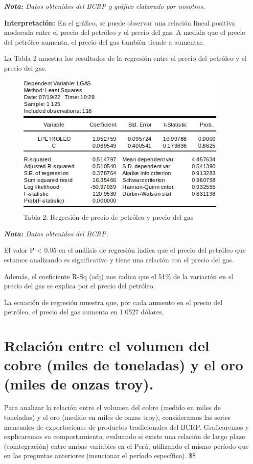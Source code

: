 \documentclass[
  a4paper,
]{article}
\begin{document}
\emph{\textbf{Nota:} Datos obtenidos del BCRP y gráfico elaborado por
nosotros.}

\textbf{Interpretación:} En el gráfico, se puede observar una relación
lineal positiva moderada entre el precio del petróleo y el precio del
gas. A medida que el precio del petróleo aumenta, el precio del gas
también tiende a aumentar.

La Tabla 2 muestra los resultados de la regresión entre el precio del
petróleo y el precio del gas.

\begin{figure}

\caption{Tabla 2: Regresión de precio de petróleo y precio del gas}

{\centering \includegraphics{20230603100307.png}

}

\end{figure}

\emph{\textbf{Nota:} Datos obtenidos del BCRP.}

El valor P \textless{} 0.05 en el análisis de regresión indica que el
precio del petróleo que estamos analizando es significativo y tiene una
relación con el precio del gas.

Además, el coeficiente R-Sq (adj) nos indica que el 51\% de la variación
en el precio del gas se explica por el precio del petróleo.

La ecuación de regresión muestra que, por cada aumento en el precio del
petróleo, el precio del gas aumenta en 1.0527 dólares.

\hypertarget{relaciuxf3n-entre-el-volumen-del-cobre-miles-de-toneladas-y-el-oro-miles-de-onzas-troy.}{%
\section{Relación entre el volumen del cobre (miles de toneladas) y el
oro (miles de onzas
troy).}\label{relaciuxf3n-entre-el-volumen-del-cobre-miles-de-toneladas-y-el-oro-miles-de-onzas-troy.}}

Para analizar la relación entre el volumen del cobre (medido en miles de
toneladas) y el oro (medido en miles de onzas troy), consideramos las
series mensuales de exportaciones de productos tradicionales del BCRP.
Graficaremos y explicaremos su comportamiento, evaluando si existe una
relación de largo plazo (cointegración) entre ambas variables en el
Perú, utilizando el mismo período que en las preguntas anteriores
(mencionar el período específico). \$\$


\printbibliography
\end{document}
